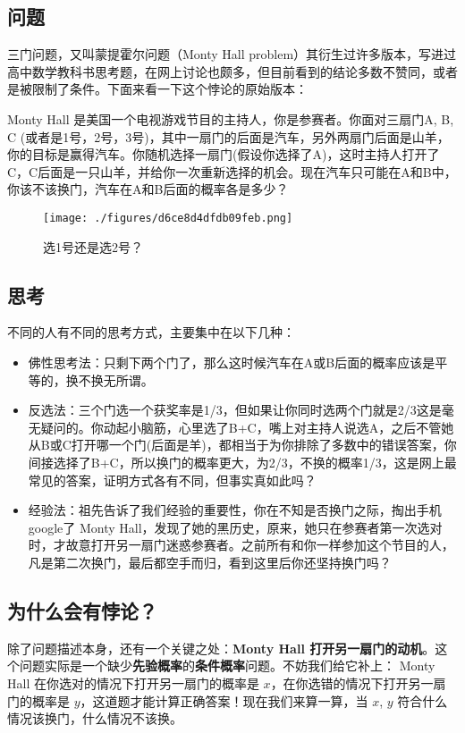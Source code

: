 
\begin{issues}
\issueDraft
\end{issues}

\subsection{问题}
三门问题，又叫蒙提霍尔问题（Monty Hall problem）其衍生过许多版本，写进过高中数学教科书思考题，在网上讨论也颇多，但目前看到的结论多数不赞同，或者是被限制了条件。下面来看一下这个悖论的原始版本：

Monty Hall 是美国一个电视游戏节目的主持人，你是参赛者。你面对三扇门A, B, C (或者是1号，2号，3号)，其中一扇门的后面是汽车，另外两扇门后面是山羊，你的目标是赢得汽车。你随机选择一扇门(假设你选择了A)，这时主持人打开了C，C后面是一只山羊，并给你一次重新选择的机会。现在汽车只可能在A和B中，你该不该换门，汽车在A和B后面的概率各是多少？

\begin{figure}[ht]
\centering
\texttt{[image: ./figures/d6ce8d4dfdb09feb.png]}
\caption{选1号还是选2号？} \label{fig_MontyH_0}
\end{figure}

\subsection{思考}
不同的人有不同的思考方式，主要集中在以下几种：

\begin{itemize}
\item 佛性思考法：只剩下两个门了，那么这时候汽车在A或B后面的概率应该是平等的，换不换无所谓。

\item 反选法：三个门选一个获奖率是1/3，但如果让你同时选两个门就是2/3这是毫无疑问的。你动起小脑筋，心里选了B+C，嘴上对主持人说选A，之后不管她从B或C打开哪一个门(后面是羊)，都相当于为你排除了多数中的错误答案，你间接选择了B+C，所以换门的概率更大，为2/3，不换的概率1/3，这是网上最常见的答案，证明方式各有不同，但事实真如此吗？

\item 经验法：祖先告诉了我们经验的重要性，你在不知是否换门之际，掏出手机google了 Monty Hall，发现了她的黑历史，原来，她只在参赛者第一次选对时，才故意打开另一扇门迷惑参赛者。之前所有和你一样参加这个节目的人，凡是第二次换门，最后都空手而归，看到这里后你还坚持换门吗？
\end{itemize}

\subsection{为什么会有悖论？}
除了问题描述本身，还有一个关键之处：\textbf{Monty Hall 打开另一扇门的动机}。这个问题实际是一个缺少\textbf{先验概率}的\textbf{条件概率}问题。不妨我们给它补上： Monty Hall 在你选对的情况下打开另一扇门的概率是 $x$，在你选错的情况下打开另一扇门的概率是 $y$，这道题才能计算正确答案！现在我们来算一算，当 $x$, $y$ 符合什么情况该换门，什么情况不该换。

